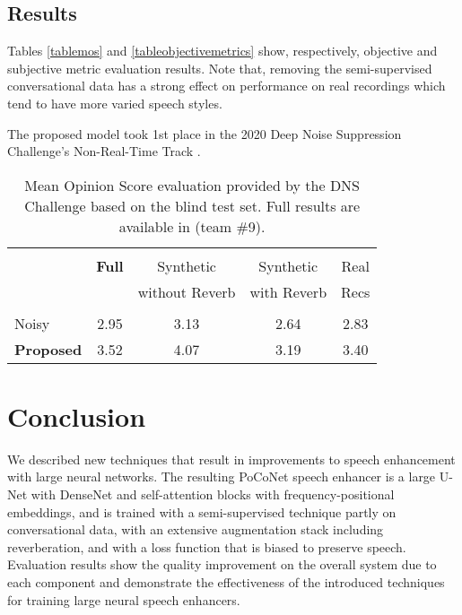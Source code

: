 \documentclass[english]{article}
\begin{document}
\subsection{Results}

Tables \ref{tablemos} and \ref{tableobjectivemetrics} show, respectively, objective and subjective metric evaluation results. Note that, removing the semi-supervised conversational data has a strong effect on performance on real recordings which tend to have more varied speech styles. 

The proposed model took 1st place in the 2020 Deep Noise Suppression Challenge's Non-Real-Time Track \cite{dnschallengefinal}. 

\begin{table}[hbt!]
\footnotesize
\centering
\begin{tabular}{lcccc} 
\hline \\[-2ex]
$\,$& \textbf{Full} & Synthetic & Synthetic & Real\\
$\,$& & without Reverb & with Reverb & Recs \\

\hline \\[-2ex]
Noisy & 2.95 & 3.13 & 2.64 & 2.83 \\
\bf{Proposed}  & 3.52 & 4.07 & 3.19 & 3.40 \\
\hline 
\end{tabular}
\vspace{0.05in}
\caption{Mean Opinion Score evaluation provided by the DNS Challenge based on the blind test set. Full results are available in \cite{dnschallengefinal} (team \#9). } 
\label{tablechallengemos}
\vspace{-0.3in}
\end{table}

\section{Conclusion}

We described new techniques that result in improvements to speech enhancement with large neural networks. The resulting PoCoNet speech enhancer is a large U-Net with DenseNet and self-attention blocks with frequency-positional embeddings, and is trained with a semi-supervised technique partly on conversational data, with an extensive augmentation stack including reverberation, and with a loss function that is biased to preserve speech. Evaluation results show the quality improvement on the overall system due to each component and demonstrate the effectiveness of the introduced techniques for training large neural speech enhancers. 




\end{document}
